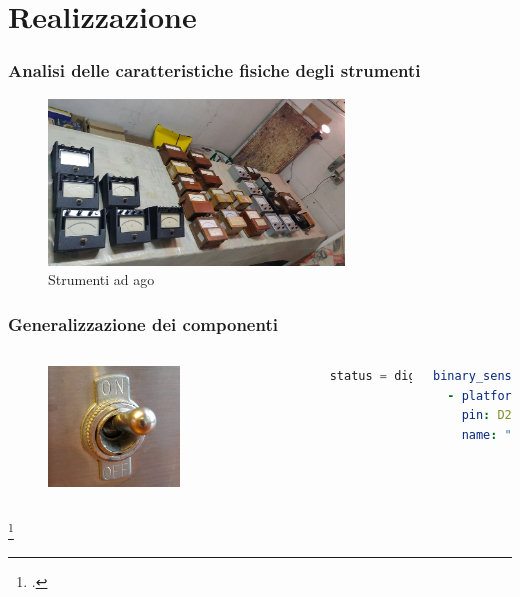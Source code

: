 \documentclass[aspectratio=169]{beamer}
\begin{document}
\section{Realizzazione}

\begin{frame}
\frametitle{Analisi delle caratteristiche fisiche degli strumenti}

\begin{figure}[h]
  \centering
  \includegraphics[width=0.7\textwidth]{strumentiago}
  \caption{Strumenti ad ago}
\end{figure}
\end{frame}

\begin{frame}[fragile]
\frametitle{Generalizzazione dei componenti}
\begin{columns}
\begin{figure}[h]
  \centering
  \includegraphics[width=0.6\textwidth]{switch}\footnotemark 
  
\end{figure}

\begin{lstlisting}[language=cpp]
status = digitalRead(D2);
\end{lstlisting}

\begin{lstlisting}[language=yaml]
binary_sensor:
  - platform: gpio
    pin: D2
    name: "Interruttore"
\end{lstlisting}
\end{columns}
\footcitetext{wiki:switch}
\end{frame}
\end{document}
